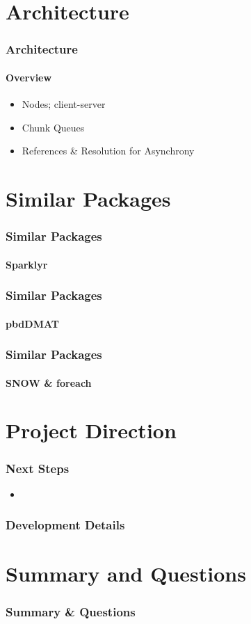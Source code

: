 \documentclass{beamer}
\begin{document}
\section{Architecture}
	\begin{frame}
		\frametitle{Architecture}
		\framesubtitle{Overview}
		\begin{itemize}
			\item Nodes; client-server
			\item Chunk Queues
			\item References \& Resolution for Asynchrony
		\end{itemize}
	\end{frame}
\section{Similar Packages}
	\begin{frame}
		\frametitle{Similar Packages}
		\framesubtitle{Sparklyr}
	\end{frame}
	\begin{frame}
		\frametitle{Similar Packages}
		\framesubtitle{pbdDMAT}
	\end{frame}
	\begin{frame}
		\frametitle{Similar Packages}
		\framesubtitle{SNOW \& foreach}
	\end{frame}
\section{Project Direction}
	\begin{frame}
		\frametitle{Next Steps}
		\begin{itemize}
			\item 
		\end{itemize}
	\end{frame}
	\begin{frame}
		\frametitle{Development Details}
		\begin{itemize}
		\end{itemize}
	\end{frame}
\section{Summary and Questions}
	\begin{frame}
		\frametitle{Summary \& Questions}
		\begin{itemize}
		\end{itemize}
	\end{frame}
\end{document}
